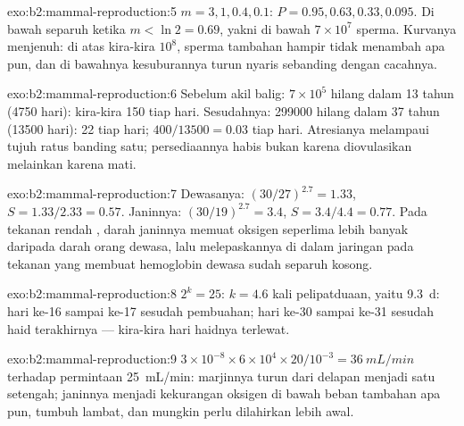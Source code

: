\begin{solution}{exo:b2:mammal-reproduction:5}
$m = 3, 1, 0.4, 0.1$: $P = 0.95, 0.63, 0.33, 0.095$. Di bawah separuh
ketika $m < \ln 2 = 0.69$, yakni di bawah $7\times 10^{7}$ sperma.
Kurvanya menjenuh: di atas kira-kira $10^{8}$, sperma tambahan hampir
tidak menambah apa pun, dan di bawahnya kesuburannya turun nyaris
sebanding dengan cacahnya.
\end{solution}

\begin{solution}{exo:b2:mammal-reproduction:6}
Sebelum akil balig: $7\times 10^{5}$ hilang dalam 13 tahun (\num{4750}
hari): kira-kira 150 tiap hari. Sesudahnya: \num{299000} hilang dalam
37 tahun (\num{13500} hari): 22 tiap hari; 
$400/\num{13500} = 0.03$ tiap hari. Atresianya melampaui 
tujuh ratus banding satu; persediaannya habis bukan karena diovulasikan
melainkan karena mati.
\end{solution}

\begin{solution}{exo:b2:mammal-reproduction:7}
Dewasanya: $(30/27)^{2.7} = 1.33$, $S = 1.33/2.33 = 0.57$. Janinnya:
$(30/19)^{2.7} = 3.4$, $S = 3.4/4.4 = 0.77$. Pada tekanan rendah
, darah janinnya memuat oksigen seperlima lebih banyak
daripada darah orang dewasa, lalu melepaskannya di dalam jaringan pada
tekanan yang membuat hemoglobin dewasa sudah separuh kosong.
\end{solution}

\begin{solution}{exo:b2:mammal-reproduction:8}
$2^{k} = 25$: $k = 4.6$ kali pelipatduaan, yaitu \qty{9.3}{d}: hari
ke-16 sampai ke-17 sesudah pembuahan; hari ke-30 sampai ke-31 sesudah
haid terakhirnya --- kira-kira hari haidnya terlewat.
\end{solution}

\begin{solution}{exo:b2:mammal-reproduction:9}
$3\times 10^{-8}\times 6\times 10^{4}\times 20/10^{-3} =
\qty{36}{mL/min}$ terhadap permintaan \qty{25}{mL/min}: marjinnya
turun dari delapan menjadi satu setengah; janinnya menjadi kekurangan
oksigen di bawah beban tambahan apa pun, tumbuh lambat, dan mungkin
perlu dilahirkan lebih awal.
\end{solution}

